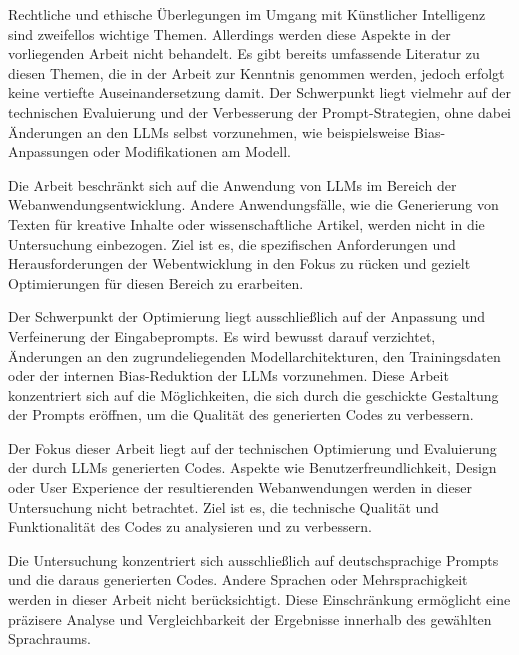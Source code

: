 Rechtliche und ethische Überlegungen im Umgang mit Künstlicher Intelligenz sind zweifellos wichtige Themen. Allerdings werden diese Aspekte in der vorliegenden Arbeit nicht behandelt. Es gibt bereits umfassende Literatur zu diesen Themen, die in der Arbeit zur Kenntnis genommen werden, jedoch erfolgt keine vertiefte Auseinandersetzung damit. Der Schwerpunkt liegt vielmehr auf der technischen Evaluierung und der Verbesserung der Prompt-Strategien, ohne dabei Änderungen an den LLMs selbst vorzunehmen, wie beispielsweise Bias-Anpassungen oder Modifikationen am Modell.\vspace{0.2cm}

Die Arbeit beschränkt sich auf die Anwendung von LLMs im Bereich der Webanwendungsentwicklung. Andere Anwendungsfälle, wie die Generierung von Texten für kreative Inhalte oder wissenschaftliche Artikel, werden nicht in die Untersuchung einbezogen. Ziel ist es, die spezifischen Anforderungen und Herausforderungen der Webentwicklung in den Fokus zu rücken und gezielt Optimierungen für diesen Bereich zu erarbeiten.\vspace{0.2cm}

Der Schwerpunkt der Optimierung liegt ausschließlich auf der Anpassung und Verfeinerung der Eingabeprompts. Es wird bewusst darauf verzichtet, Änderungen an den zugrundeliegenden Modellarchitekturen, den Trainingsdaten oder der internen Bias-Reduktion der LLMs vorzunehmen. Diese Arbeit konzentriert sich auf die Möglichkeiten, die sich durch die geschickte Gestaltung der Prompts eröffnen, um die Qualität des generierten Codes zu verbessern.\vspace{0.2cm}

Der Fokus dieser Arbeit liegt auf der technischen Optimierung und Evaluierung der durch LLMs generierten Codes. Aspekte wie Benutzerfreundlichkeit, Design oder User Experience der resultierenden Webanwendungen werden in dieser Untersuchung nicht betrachtet. Ziel ist es, die technische Qualität und Funktionalität des Codes zu analysieren und zu verbessern.\vspace{0.2cm}

Die Untersuchung konzentriert sich ausschließlich auf deutschsprachige Prompts und die daraus generierten Codes. Andere Sprachen oder Mehrsprachigkeit werden in dieser Arbeit nicht berücksichtigt. Diese Einschränkung ermöglicht eine präzisere Analyse und Vergleichbarkeit der Ergebnisse innerhalb des gewählten Sprachraums.
